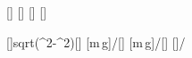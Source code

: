 [\kg]
[\meter]
[\meter]
[\mpss]

[]{sqrt(\lRX^2-\hRX^2)}[\meter]
[m\,g\cdot{}]{\mX*\gX*\hRX/\lRX}[\newton]
[m\,g\cdot{}]{\mX*\gX*\bRX/\lRX}[\newton]
[]{\hRX/\bRX}
